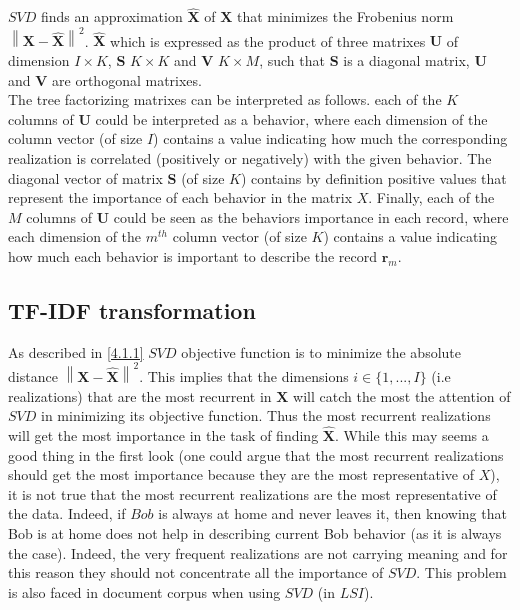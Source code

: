$SVD$ finds an approximation $\boldsymbol{\widehat{X}}$ of $\boldsymbol{X}$ that minimizes the Frobenius norm $\left \|  \boldsymbol{X}-\boldsymbol{\widehat{X}}\right \|^{2}$. $\boldsymbol{\widehat{X}}$ which is expressed as the product of three matrixes $\boldsymbol{U}$ of dimension $I\times K$, $\boldsymbol{S}$ $K \times K$ and $\boldsymbol{V}$ $K\times M$, such that $\boldsymbol{S}$ is a diagonal matrix, $\boldsymbol{U}$ and $\boldsymbol{V}$ are orthogonal matrixes.
\\The tree factorizing matrixes can be interpreted as follows. each of the $K$ columns of $\boldsymbol{U}$ could be interpreted as a behavior, where each dimension of the column vector (of size $I$) contains a value indicating how much the corresponding realization is correlated (positively or negatively) with the given behavior. The diagonal vector of matrix $\boldsymbol{S}$ (of size $K$) contains by definition positive values that represent the importance of each behavior in the matrix $X$. Finally, each of the $M$ columns of  $\boldsymbol{U}$ could be seen as the behaviors importance in each record, where each dimension of the $m^{th}$ column vector (of size $K$) contains a value indicating how much each behavior is important to describe the record $\mathbf{r}_{m}$.

\subsection{TF-IDF transformation}
As described in \ref{4.1.1} $SVD$ objective function is to minimize the absolute distance $\left \|  \boldsymbol{X}-\boldsymbol{\widehat{X}}\right \|^{2}$. This implies that the dimensions $i\in\{1,...,I\}$ (i.e realizations) that are the most recurrent in $\boldsymbol{X}$ will catch the most the attention of $SVD$ in minimizing its objective function. Thus the most recurrent realizations will get the most importance in the task of finding $\boldsymbol{\widehat{X}}$. While this may seems a good thing in the first look (one could argue that the most recurrent realizations should get the most importance because they are the most representative of $X$), it is not true that the most recurrent realizations are the most representative of the data. Indeed, if $Bob$ is always at home and never leaves it, then knowing that Bob is at home does not help in describing current Bob behavior (as it is always the case). Indeed, the very frequent realizations are not carrying meaning and for this reason they should not concentrate all the importance of $SVD$. This problem is also faced in document corpus when using $SVD$ (in $LSI$). \par

